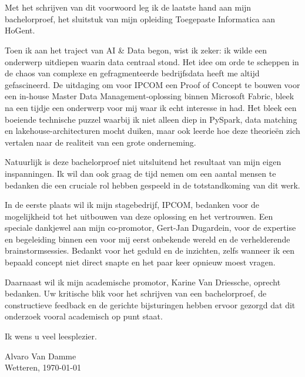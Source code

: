 
\chapter*{}%
\label{ch:voorwoord}

Met het schrijven van dit voorwoord leg ik de laatste hand aan mijn bachelorproef, het sluitstuk van mijn opleiding Toegepaste Informatica aan HoGent. 

Toen ik aan het traject van AI \& Data begon, wist ik zeker: ik wilde een onderwerp uitdiepen waarin data centraal stond. Het idee om orde te scheppen in de chaos van complexe en gefragmenteerde bedrijfsdata heeft me altijd gefascineerd. De uitdaging om voor IPCOM een Proof of Concept te bouwen voor een in-house Master Data Management-oplossing binnen Microsoft Fabric, bleek na een tijdje een onderwerp voor mij waar ik echt interesse in had. Het bleek een boeiende technische puzzel waarbij ik niet alleen diep in PySpark, data matching en lakehouse-architecturen mocht duiken, maar ook leerde hoe deze theorieën zich vertalen naar de realiteit van een grote onderneming.

Natuurlijk is deze bachelorproef niet uitsluitend het resultaat van mijn eigen inspanningen. Ik wil dan ook graag de tijd nemen om een aantal mensen te bedanken die een cruciale rol hebben gespeeld in de totstandkoming van dit werk.

In de eerste plaats wil ik mijn stagebedrijf, IPCOM, bedanken voor de mogelijkheid tot het uitbouwen van deze oplossing en het vertrouwen. Een speciale dankjewel aan mijn co-promotor, Gert-Jan Dugardein, voor de expertise en begeleiding binnen een voor mij eerst onbekende wereld en de verhelderende brainstormsessies. Bedankt voor het geduld en de inzichten, zelfs wanneer ik een bepaald concept niet direct snapte en het paar keer opnieuw moest vragen.

Daarnaast wil ik mijn academische promotor, Karine Van Driessche, oprecht bedanken. Uw kritische blik voor het schrijven van een bachelorproef, de constructieve feedback en de gerichte bijsturingen hebben ervoor gezorgd dat dit onderzoek vooral academisch op punt staat.

Ik wens u veel leesplezier.

\vspace{2cm}

\noindent Alvaro Van Damme\\
\noindent Wetteren, \today